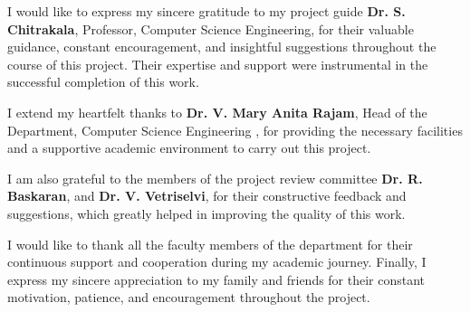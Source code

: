  I would like to express my sincere gratitude to my project guide \textbf{Dr. S. Chitrakala}, Professor, Computer Science Engineering, for their valuable guidance, constant encouragement, and insightful suggestions throughout the course of this project. Their expertise and support were instrumental in the successful completion of this work.

I extend my heartfelt thanks to \textbf{Dr. V. Mary Anita Rajam}, Head of the Department, Computer Science Engineering , for providing the necessary facilities and a supportive academic environment to carry out this project.

I am also grateful to the members of the project review committee \textbf{Dr. R. Baskaran}, and \textbf{Dr. V. Vetriselvi}, for their constructive feedback and suggestions, which greatly helped in improving the quality of this work.

I would like to thank all the faculty members of the department for their continuous support and cooperation during my academic journey. Finally, I express my sincere appreciation to my family and friends for their constant motivation, patience, and encouragement throughout the project.
